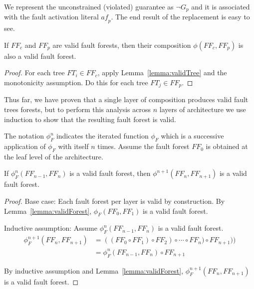 We represent the unconstrained (violated) guarantee as $\neg G_p$ and it is associated with the fault activation literal $\mathit{af}_p$. The end result of the replacement is easy to see.

\begin{lemma} If $\mathit{FF}_c$ and $\mathit{FF}_p$ are valid fault forests, then their composition $\phi(\mathit{FF}_c, \mathit{FF}_p)$ is also a valid fault forest. 
\begin{proof}

For each tree $\mathit{FT}_i \in \mathit{FF}_c$, apply Lemma~\ref{lemma:validTree} and the monotonicity assumption. Do this for each tree $\mathit{FT}_j \in \mathit{FF}_p$.
\end{proof}
\label{lemma:validForest}
\end{lemma}

Thus far, we have proven that a single layer of composition produces valid fault trees forests, but to perform this analysis across $n$ layers of architecture we use induction to show that the resulting fault forest is valid. 

The notation $\phi_F^n$ indicates the iterated function $\phi_F$ which is a successive application of $\phi_F$ with itself $n$ times. Assume the fault forest $\mathit{FF}_0$ is obtained at the leaf level of the architecture.

\begin{theorem} If $\phi_F^n(\mathit{FF}_{n-1}, \mathit{FF}_n)$ is a valid fault forest, then $\phi^{n+1}(\mathit{FF}_{n}, \mathit{FF}_{n+1})$ is a valid fault forest.
\begin{proof}

Base case: Each fault forest per layer is valid by construction. By Lemma~\ref{lemma:validForest}, $\phi_F(\mathit{FF}_{0}, \mathit{FF}_1)$ is a valid fault forest.

Inductive assumption: Assume $\phi_F^n(\mathit{FF}_{n-1}, \mathit{FF}_n)$ is a valid fault forest.
\begin{equation*}
\begin{split}
\phi_F^{n+1}(\mathit{FF}_{n}, \mathit{FF}_{n+1}) &= ((\mathit{FF}_0 \circ \mathit{FF}_1) \circ \mathit{FF}_2) \circ \cdots \circ \mathit{FF}_n) \circ \mathit{FF}_{n+1})) \\
  &= \phi_F^n(\mathit{FF}_{n-1}, \mathit{FF}_n) \circ \mathit{FF}_{n+1}
\end{split}
\end{equation*}


By inductive assumption and Lemma~\ref{lemma:validForest}, $\phi_F^{n+1}(\mathit{FF}_{n}, \mathit{FF}_{n+1})$ is a valid fault forest.

\end{proof}
\label{thm:indForest}
\end{theorem}


